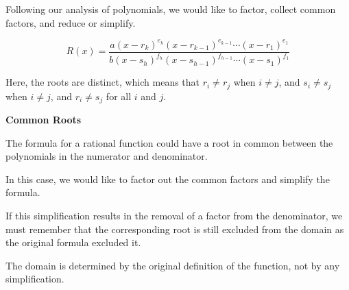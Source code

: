 \documentclass{ximera}
\begin{document}
Following our analysis of polynomials, we would like to factor, collect common factors, and reduce or simplify.


\[  R(x)  = \frac{a (x - r_k)^{e_k} (x - r_{k-1})^{e_{k-1}} \cdots (x - r_1)^{e_1} }{b (x - s_h)^{f_h} (x - s_{h-1})^{f_{h-1}} \cdots (x - s_1)^{f_1}}            \]


Here, the roots are distinct, which means that  $r_i \ne r_j$ when $i \ne j$, and $s_i \ne s_j$ when $i \ne j$, and $r_i \ne s_j$ for all $i$ and $j$.



\begin{warning}   \textbf{\textcolor{red!70!black}{Common Roots}} 


The formula for a rational function could have a root in common between the polynomials in the numerator and denominator.

In this case, we would like to factor out the common factors and simplify the formula.

If this simplification results in the removal of a factor from the denominator, we must remember that the corresponding root is still excluded from the domain as the original formula excluded it.

The domain is determined by the original definition of the function, not by any simplification.

\end{warning}
\end{document}
